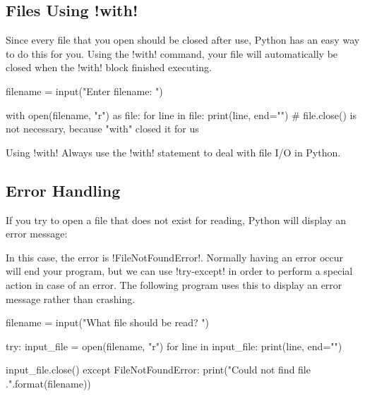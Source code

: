 \documentclass[11pt]{cselabheader}
\begin{document}
\subsection{Files Using \protect\pythoninline!with!}
Since every file that you open should be closed after use, Python has an easy
way to do this for you. Using the \pythoninline!with! command, your file will
automatically be closed when the \pythoninline!with! block finished executing.

\begin{python3code}
filename = input("Enter filename: ")

with open(filename, "r") as file:
    for line in file:
        print(line, end="")
# file.close() is not necessary, because "with" closed it for us
\end{python3code}

\begin{warningbox}{Using \protect\pythoninline!with!}
  Always use the \pythoninline!with! statement to deal with file I/O in Python.
\end{warningbox}

\subsection{Error Handling}
If you try to open a file that does not exist for reading, Python will display
an error message:


In this case, the error is \pythoninline!FileNotFoundError!. Normally having an
error occur will end your program, but we can use \pythoninline!try-except! in
order to perform a special action in case of an error. The following program
uses this to display an error message rather than crashing.

\begin{python3code}
filename = input("What file should be read? ")

try:
    input_file = open(filename, "r")
    for line in input_file:
        print(line, end="")

    input_file.close()
except FileNotFoundError:
    print("Could not find file {}.".format(filename))
\end{python3code}
\end{document}

